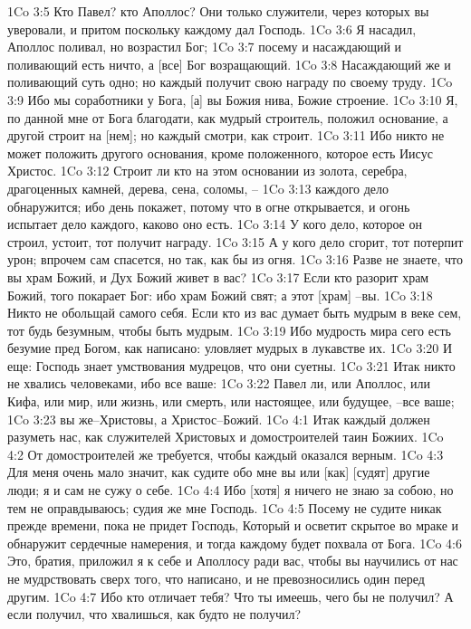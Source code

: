 1Co 3:5  Кто Павел? кто Аполлос? Они только служители, через которых вы уверовали, и притом поскольку каждому дал Господь.
1Co 3:6  Я насадил, Аполлос поливал, но возрастил Бог;
1Co 3:7  посему и насаждающий и поливающий есть ничто, а [все] Бог возращающий.
1Co 3:8  Насаждающий же и поливающий суть одно; но каждый получит свою награду по своему труду.
1Co 3:9  Ибо мы соработники у Бога, [а] вы Божия нива, Божие строение.
1Co 3:10  Я, по данной мне от Бога благодати, как мудрый строитель, положил основание, а другой строит на [нем]; но каждый смотри, как строит.
1Co 3:11  Ибо никто не может положить другого основания, кроме положенного, которое есть Иисус Христос.
1Co 3:12  Строит ли кто на этом основании из золота, серебра, драгоценных камней, дерева, сена, соломы, --
1Co 3:13  каждого дело обнаружится; ибо день покажет, потому что в огне открывается, и огонь испытает дело каждого, каково оно есть.
1Co 3:14  У кого дело, которое он строил, устоит, тот получит награду.
1Co 3:15  А у кого дело сгорит, тот потерпит урон; впрочем сам спасется, но так, как бы из огня.
1Co 3:16  Разве не знаете, что вы храм Божий, и Дух Божий живет в вас?
1Co 3:17  Если кто разорит храм Божий, того покарает Бог: ибо храм Божий свят; а этот [храм] --вы.
1Co 3:18  Никто не обольщай самого себя. Если кто из вас думает быть мудрым в веке сем, тот будь безумным, чтобы быть мудрым.
1Co 3:19  Ибо мудрость мира сего есть безумие пред Богом, как написано: уловляет мудрых в лукавстве их.
1Co 3:20  И еще: Господь знает умствования мудрецов, что они суетны.
1Co 3:21  Итак никто не хвались человеками, ибо все ваше:
1Co 3:22  Павел ли, или Аполлос, или Кифа, или мир, или жизнь, или смерть, или настоящее, или будущее, --все ваше;
1Co 3:23  вы же--Христовы, а Христос--Божий.
1Co 4:1  Итак каждый должен разуметь нас, как служителей Христовых и домостроителей таин Божиих.
1Co 4:2  От домостроителей же требуется, чтобы каждый оказался верным.
1Co 4:3  Для меня очень мало значит, как судите обо мне вы или [как] [судят] другие люди; я и сам не сужу о себе.
1Co 4:4  Ибо [хотя] я ничего не знаю за собою, но тем не оправдываюсь; судия же мне Господь.
1Co 4:5  Посему не судите никак прежде времени, пока не придет Господь, Который и осветит скрытое во мраке и обнаружит сердечные намерения, и тогда каждому будет похвала от Бога.
1Co 4:6  Это, братия, приложил я к себе и Аполлосу ради вас, чтобы вы научились от нас не мудрствовать сверх того, что написано, и не превозносились один перед другим.
1Co 4:7  Ибо кто отличает тебя? Что ты имеешь, чего бы не получил? А если получил, что хвалишься, как будто не получил?
